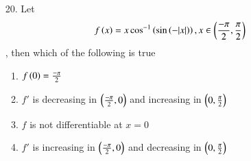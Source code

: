 \documentclass[journal,12pt,onecolumn]{IEEEtran}
\theoremstyle{remark}
\begin{document}
\begin{enumerate}
	\item[20.] Let
		\begin{align}
			f\left(x\right) = x \cos ^{-1}\left(\sin \left(-|x|\right)\right), x \in \left(\frac{-\pi}{2}, \frac{\pi}{2}\right)
		\end{align}, then which of the following is true
		
		\begin{enumerate}
			\item $f\left(0\right) = \frac{-\pi}{2}$ 
			\item $f'$ is decreasing in $\left(\frac{-\pi}{2}, 0\right)$ and increasing in $\left(0, \frac{\pi}{2}\right)$ 
			\item $f$ is not differentiable at $x = 0$  
			\item $f'$ is increasing in $\left(\frac{-\pi}{2}, 0\right)$ and decreasing in $\left(0, \frac{\pi}{2}\right)$
		\end{enumerate}



\end{enumerate}
\end{document}
